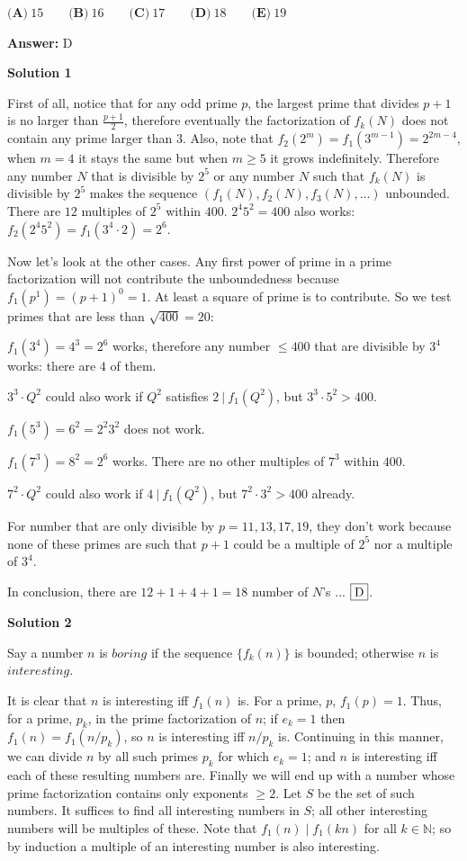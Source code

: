 \begin{enumerate}
 $\textbf{(A)}\ 15\qquad\textbf{(B)}\ 16\qquad\textbf{(C)}\ 17\qquad\textbf{(D)}\ 18\qquad\textbf{(E)}\ 19$

 \textbf{Answer: }D



\textbf{Solution 1}

First of all, notice that for any odd prime $p$, the largest prime that divides $p+1$ is no larger than $\frac{p+1}{2}$, therefore eventually the factorization of $f_k(N)$ does not contain any prime larger than $3$. Also, note that $f_2(2^m) = f_1(3^{m-1})=2^{2m-4}$, when $m=4$ it stays the same but when $m\geq 5$ it grows indefinitely. Therefore any number $N$ that is divisible by $2^5$ or any number $N$ such that $f_k(N)$ is divisible by $2^5$ makes the sequence $(f_1(N),f_2(N),f_3(N),\dots )$ unbounded. There are $12$ multiples of $2^5$ within $400$. $2^4 5^2=400$ also works: $f_2(2^4 5^2) = f_1(3^4 \cdot 2) = 2^6$.

 Now let's look at the other cases. Any first power of prime in a prime factorization will not contribute the unboundedness because $f_1(p^1)=(p+1)^0=1$. At least a square of prime is to contribute. So we test primes that are less than $\sqrt{400}=20$:

 $f_1(3^4)=4^3=2^6$ works, therefore any number $\leq 400$ that are divisible by $3^4$ works: there are $4$ of them.

 $3^3 \cdot Q^2$ could also work if $Q^2$ satisfies $2~|~f_1(Q^2)$, but $3^3 \cdot 5^2 > 400$.

 $f_1(5^3)=6^2 = 2^2 3^2$ does not work.

 $f_1(7^3)=8^2=2^6$ works. There are no other multiples of $7^3$ within $400$.

 $7^2 \cdot Q^2$ could also work if $4~|~f_1(Q^2)$, but $7^2 \cdot 3^2 > 400$ already.

 For number that are only divisible by $p=11, 13, 17, 19$, they don't work because none of these primes are such that $p+1$ could be a multiple of $2^5$ nor a multiple of $3^4$.

 In conclusion, there are $12+1+4+1=18$ number of $N$'s ... $\framebox{D}$.

 



\textbf{Solution 2}

Say a number $n$ is $\textit{boring}$ if the sequence $\{f_k(n)\}$ is bounded; otherwise $n$ is $\textit{interesting}$. 

 It is clear that $n$ is interesting iff $f_1(n)$ is. For a prime, $p$, $f_1(p)=1$. Thus, for a prime, $p_k$, in the prime factorization of $n$; if $e_k=1$ then $f_1(n)=f_1(n/p_k)$, so $n$ is interesting iff $n/p_k$ is. Continuing in this manner, we can divide $n$ by all such primes $p_k$ for which $e_k=1$; and $n$ is interesting iff each of these resulting numbers are. Finally we will end up with a number  whose prime factorization  contains only exponents $\ge 2$. Let $S$ be the set of such numbers. It suffices to find all interesting numbers in $S$; all other interesting numbers will be multiples of these. Note that  $f_1(n)\mid f_1(kn)$ for all $k\in\mathbb{N}$; so by induction a multiple of an interesting number is also interesting.


\end{enumerate}
